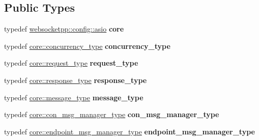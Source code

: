 \subsection*{Public Types}
\begin{DoxyCompactItemize}
\item 
\mbox{\label{structtestee__config_a3481397ac125665b93ade70750f08ad0}} 
typedef \mbox{\hyperlink{structwebsocketpp_1_1config_1_1asio}{websocketpp\+::config\+::asio}} {\bfseries core}
\item 
\mbox{\label{structtestee__config_a203634e59fa5b8cd8536c15c2617a2c6}} 
typedef \mbox{\hyperlink{classwebsocketpp_1_1concurrency_1_1basic}{core\+::concurrency\+\_\+type}} {\bfseries concurrency\+\_\+type}
\item 
\mbox{\label{structtestee__config_a150dbe6906015185777f2e0d70c26585}} 
typedef \mbox{\hyperlink{classwebsocketpp_1_1http_1_1parser_1_1request}{core\+::request\+\_\+type}} {\bfseries request\+\_\+type}
\item 
\mbox{\label{structtestee__config_a633d1324b3a68ff2a82437ee3c123dff}} 
typedef \mbox{\hyperlink{classwebsocketpp_1_1http_1_1parser_1_1response}{core\+::response\+\_\+type}} {\bfseries response\+\_\+type}
\item 
\mbox{\label{structtestee__config_acda8dbb14c22a8774591fbf475211490}} 
typedef \mbox{\hyperlink{classwebsocketpp_1_1message__buffer_1_1message}{core\+::message\+\_\+type}} {\bfseries message\+\_\+type}
\item 
\mbox{\label{structtestee__config_a33ef92b977927b8aa08c7ec4224e26f2}} 
typedef \mbox{\hyperlink{classwebsocketpp_1_1message__buffer_1_1alloc_1_1con__msg__manager}{core\+::con\+\_\+msg\+\_\+manager\+\_\+type}} {\bfseries con\+\_\+msg\+\_\+manager\+\_\+type}
\item 
\mbox{\label{structtestee__config_abf42409cd683ea4a35c91a96ebf7248b}} 
typedef \mbox{\hyperlink{classwebsocketpp_1_1message__buffer_1_1alloc_1_1endpoint__msg__manager}{core\+::endpoint\+\_\+msg\+\_\+manager\+\_\+type}} {\bfseries endpoint\+\_\+msg\+\_\+manager\+\_\+type}
\item 

\end{DoxyCompactItemize}
